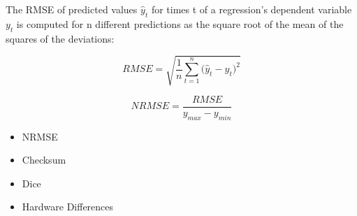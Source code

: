 The RMSE of predicted values ${\displaystyle {\hat {y}}_{t}}$  for times t of a regression's dependent variable ${\displaystyle y_{t}}$ is computed for n different predictions as the square root of the mean of the squares of the deviations:\\
\begin{center}
  \begin{equation}
     RMSE = {\sqrt {\frac{1} {n}{\sum\limits_{t = 1}^n {(\hat{y}_{t} - {y}_{t} } })^{2} } }
  \end{equation}
\end{center}

\begin{center}
  \begin{equation}
    NRMSE = {\frac{RMSE} {y_{max} - y_{min}}}
  \end{equation}
\end{center}

\begin{itemize}
\item NRMSE
\item Checksum
\item Dice
\item Hardware Differences
\end{itemize}
